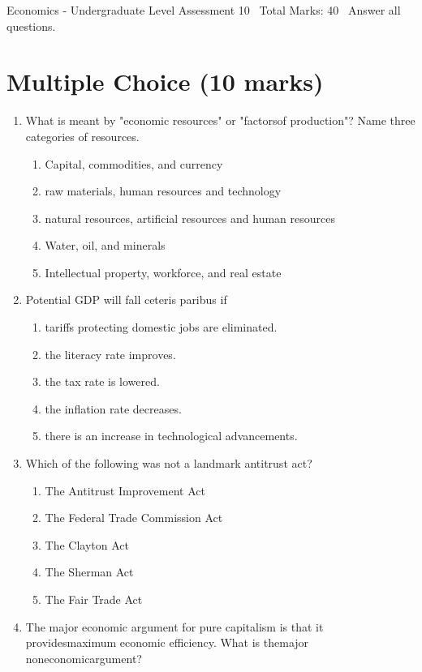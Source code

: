 \documentclass[12pt]{article}
\begin{document}
\begin{center}
Economics - Undergraduate Level Assessment 10 \
Total Marks: 40 \
Answer all questions.
\end{center}

\section*{Multiple Choice (10 marks)}
\begin{enumerate}[label=\arabic*.]
\item What is meant by "economic resources" or "factorsof production"? Name three categories of resources.
\begin{enumerate}[label=(\alph*)]
    \item Capital, commodities, and currency
    \item raw materials, human resources and technology
    \item natural resources, artificial resources and human resources
    \item Water, oil, and minerals
    \item Intellectual property, workforce, and real estate
\end{enumerate}
\item Potential GDP will fall ceteris paribus if
\begin{enumerate}[label=(\alph*)]
    \item tariffs protecting domestic jobs are eliminated.
    \item the literacy rate improves.
    \item the tax rate is lowered.
    \item the inflation rate decreases.
    \item there is an increase in technological advancements.
\end{enumerate}
\item Which of the following was not a landmark antitrust act?
\begin{enumerate}[label=(\alph*)]
    \item The Antitrust Improvement Act
    \item The Federal Trade Commission Act
    \item The Clayton Act
    \item The Sherman Act
    \item The Fair Trade Act
\end{enumerate}
\item The major economic argument for pure capitalism is that it providesmaximum economic efficiency. What is themajor noneconomicargument?

\end{enumerate}
\end{document}
